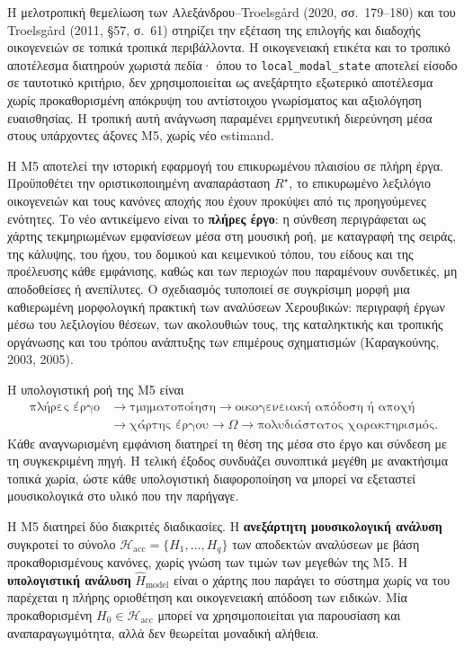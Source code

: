 \documentclass[11pt,a4paper]{article}
\begin{document}
Η μελοτροπική θεμελίωση των Αλεξάνδρου--Troelsgård (2020, σσ.~179--180) και του Troelsgård (2011, §57, σ.~61) στηρίζει την εξέταση της επιλογής και διαδοχής οικογενειών σε τοπικά τροπικά περιβάλλοντα. Η οικογενειακή ετικέτα και το τροπικό αποτέλεσμα διατηρούν χωριστά πεδία· όπου το \texttt{local\_modal\_state} αποτελεί είσοδο σε ταυτοτικό κριτήριο, δεν χρησιμοποιείται ως ανεξάρτητο εξωτερικό αποτέλεσμα χωρίς προκαθορισμένη απόκρυψη του αντίστοιχου γνωρίσματος και αξιολόγηση ευαισθησίας. Η τροπική αυτή ανάγνωση παραμένει ερμηνευτική διερεύνηση μέσα στους υπάρχοντες άξονες M5, χωρίς νέο estimand.

Η M5 αποτελεί την ιστορική εφαρμογή του επικυρωμένου πλαισίου σε πλήρη έργα. Προϋποθέτει την οριστικοποιημένη αναπαράσταση $R^\star$, το επικυρωμένο λεξιλόγιο οικογενειών και τους κανόνες αποχής που έχουν προκύψει από τις προηγούμενες ενότητες. Το νέο αντικείμενο είναι το \textbf{πλήρες έργο}: η σύνθεση περιγράφεται ως χάρτης τεκμηριωμένων εμφανίσεων μέσα στη μουσική ροή, με καταγραφή της σειράς, της κάλυψης, του ήχου, του δομικού και κειμενικού τόπου, του είδους και της προέλευσης κάθε εμφάνισης, καθώς και των περιοχών που παραμένουν συνδετικές, μη αποδοθείσες ή ανεπίλυτες. Ο σχεδιασμός τυποποιεί σε συγκρίσιμη μορφή μια καθιερωμένη μορφολογική πρακτική των αναλύσεων Χερουβικών: περιγραφή έργων μέσω του λεξιλογίου θέσεων, των ακολουθιών τους, της καταληκτικής και τροπικής οργάνωσης και του τρόπου ανάπτυξης των επιμέρους σχηματισμών (Καραγκούνης, 2003, 2005).

Η υπολογιστική ροή της M5 είναι
\[
\begin{aligned}
\text{πλήρες έργο}
&\rightarrow \text{τμηματοποίηση}
\rightarrow \text{οικογενειακή απόδοση ή αποχή}\\
&\rightarrow \text{χάρτης έργου}
\rightarrow \Omega
\rightarrow \text{πολυδιάστατος χαρακτηρισμός}.
\end{aligned}
\]
Κάθε αναγνωρισμένη εμφάνιση διατηρεί τη θέση της μέσα στο έργο και σύνδεση με τη συγκεκριμένη πηγή. Η τελική έξοδος συνδυάζει συνοπτικά μεγέθη με ανακτήσιμα τοπικά χωρία, ώστε κάθε υπολογιστική διαφοροποίηση να μπορεί να εξεταστεί μουσικολογικά στο υλικό που την παρήγαγε.

Η M5 διατηρεί δύο διακριτές διαδικασίες. Η \textbf{ανεξάρτητη μουσικολογική ανάλυση} συγκροτεί το σύνολο $\mathcal H_{\mathrm{acc}}=\{H_1,\ldots,H_q\}$ των αποδεκτών αναλύσεων με βάση προκαθορισμένους κανόνες, χωρίς γνώση των τιμών των μεγεθών της M5. Η \textbf{υπολογιστική ανάλυση} $\widehat H_{\mathrm{model}}$ είναι ο χάρτης που παράγει το σύστημα χωρίς να του παρέχεται η πλήρης οριοθέτηση και οικογενειακή απόδοση των ειδικών. Μία προκαθορισμένη $H_0\in\mathcal H_{\mathrm{acc}}$ μπορεί να χρησιμοποιείται για παρουσίαση και αναπαραγωγιμότητα, αλλά δεν θεωρείται μοναδική αλήθεια.
\end{document}
